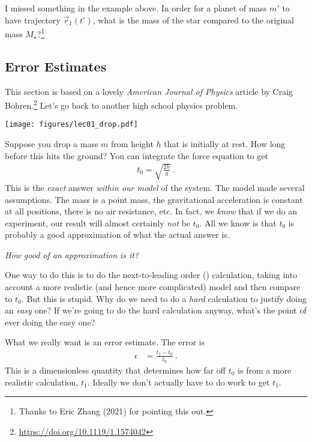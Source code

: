 \begin{exercise} 
I missed something in the example above. In order for a planet of mass $m'$ to have trajectory $\vec r_1(t')$, what is the mass of the star compared to the original mass $M_\star$?\footnote{Thanks to Eric Zhang (2021) for pointing this out.} 
\end{exercise}

\subsection{Error Estimates}

This section is based on a lovely \emph{American Journal of Physics} article by Craig Bohren.\footnote{\url{https://doi.org/10.1119/1.1574042}} Let’s go back to another high school physics problem. 

\begin{center}
\texttt{[image: figures/lec01\_drop.pdf]}
\end{center}

Suppose you drop a mass $m$ from height $h$ that is initially at rest. How long before this hits the ground? You can integrate the force equation to get
\begin{align}
  t_0 = \sqrt{\frac{2h}{g}} \ .
\end{align}
This is the \emph{exact} answer \emph{within our model} of the system. The model made several assumptions. The mass is a point mass, the gravitational acceleration is constant at all positions, there is no air resistance, etc. In fact, we \emph{know} that if we do an experiment, our result will almost certainly \emph{not} be $t_0$. All we know is that $t_0$ is probably a good approximation of what the actual answer is.

\emph{How good of an approximation is it?}

One way to do this is to do the next-to-leading order () calculation, taking into account a more realistic (and hence more complicated) model and then compare to $t_0$. But this is stupid. Why do we need to do a \emph{hard} calculation to justify doing an \emph{easy} one? If we’re going to do the hard calculation anyway, what’s the point of ever doing the easy one?

What we really want is an error estimate. The error is
\begin{align}
  \epsilon &= \frac{t_1 - t_0}{t_0} \ .
\end{align}
This is a dimensionless quantity that determines how far off $t_0$ is from a more realistic calculation, $t_1$. Ideally we don’t actually have to do work to get $t_1$. 


